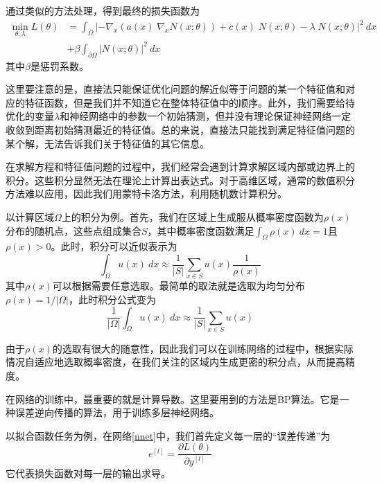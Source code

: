 通过类似的方法处理，得到最终的损失函数为
\begin{equation}
\begin{split}
\min_{\theta, \lambda} L(\theta) & = \int_{\Omega} |-\nabla_x(a(x) \; \nabla_x N(x; \theta)) + c(x) \; N(x; \theta) - \lambda \;  N(x; \theta)|^2 \ dx \\
& + \beta \int_{\partial \Omega} |N(x; \theta)|^2 \ dx
\end{split}
\end{equation}
其中$\beta$是惩罚系数。

这里要注意的是，直接法只能保证优化问题的解近似等于问题的某一个特征值和对应的特征函数，但是我们并不知道它在整体特征值中的顺序。此外，我们需要给待优化的变量$\lambda$和神经网络中的参数一个初始猜测，但并没有理论保证神经网络一定收敛到距离初始猜测最近的特征值。总的来说，直接法只能找到满足特征值问题的某个解，无法告诉我们关于特征值的其它信息。


在求解方程和特征值问题的过程中，我们经常会遇到计算求解区域内部或边界上的积分。这些积分显然无法在理论上计算出表达式。对于高维区域，通常的数值积分方法难以应用，因此我们用蒙特卡洛方法，利用随机数计算积分。

以计算区域$\Omega$上的积分为例。首先，我们在区域上生成服从概率密度函数为$\rho(x)$分布的随机点，这些点组成集合$S$，其中概率密度函数满足$\int_{\Omega} \rho(x) \ dx = 1$且$\rho(x) > 0$。此时，积分可以近似表示为
\begin{equation}
\int_{\Omega} u(x) \ dx \approx \frac{1}{|S|} \sum_{x \in S} u(x) \frac{1}{\rho(x)}
\end{equation}
其中$\rho(x)$可以根据需要任意选取。最简单的取法就是选取为均匀分布$\rho(x) = 1 / |\Omega|$，此时积分公式变为
\begin{equation}
\frac{1}{|\Omega|} \int_{\Omega} u(x) \ dx \approx \frac{1}{|S|} \sum_{x \in S} u(x)
\end{equation}

由于$\rho(x)$的选取有很大的随意性，因此我们可以在训练网络的过程中，根据实际情况自适应地选取概率密度，在我们关注的区域内生成更密的积分点，从而提高精度。


在网络的训练中，最重要的就是计算导数。这里要用到的方法是BP算法。它是一种误差逆向传播的算法，用于训练多层神经网络。

以拟合函数任务为例，在网络\ref{nnet}中，我们首先定义每一层的“误差传递”为
\begin{equation}
e^{[l]} = \frac{\partial L(\theta)}{\partial y^{[l]}}
\end{equation}
它代表损失函数对每一层的输出求导。

